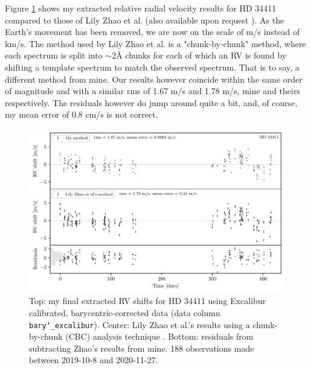 

Figure \ref{fig:HD34411_rvs} shows my extracted relative radial velocity results for HD 34411 compared to those of Lily Zhao et al. (also available upon request \cite{yale_data}). As the Earth's movement has been removed, we are now on the scale of m/s instead of km/s. The method used by Lily Zhao et al. is a "chunk-by-chunk" method, where each spectrum is split into $\sim$2Å chunks for each of which an RV is found by shifting a template spectrum to match the observed spectrum. That is to say, a different method from mine. Our results however coincide within the same order of magnitude and with a similar rms of 1.67 m/s and 1.78 m/s, mine and theirs respectively. The residuals however do jump around quite a bit, and, of course, my mean error of 0.8 cm/s is not correct. 

\begin{figure}%
    \begin{wide}  
        \includegraphics[width=\textwidth]{figures/HD34411_barycentric_rv_vs_lily.pdf}
        \caption{Top: my final extracted RV shifts for HD 34411 using Excalibur calibrated, barycentric-corrected data (data column \texttt{bary\char`_excalibur}). Center: Lily Zhao et al.'s results using a chunk-by-chunk (CBC) analysis technique \cite{yale_data}. Bottom: residuals from subtracting Zhao's results from mine. 188 observations made between 2019-10-8 and 2020-11-27.}
        \label{fig:HD34411_rvs}
    \end{wide}
\end{figure}


